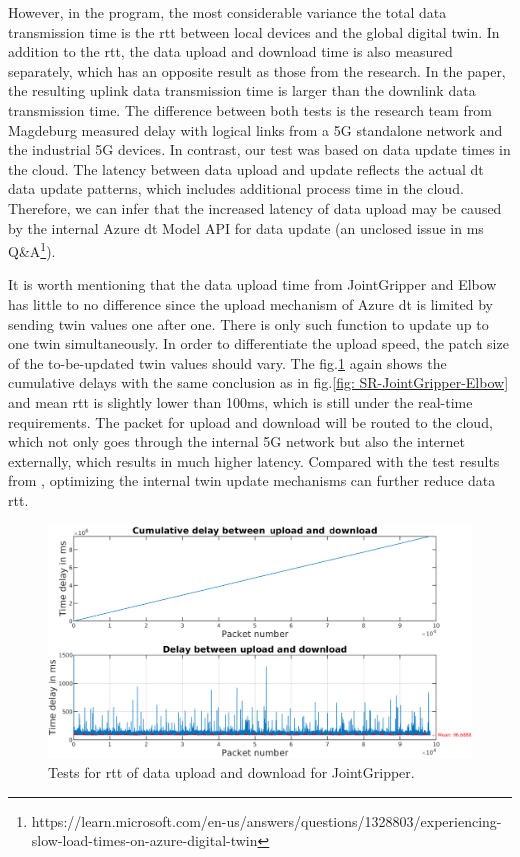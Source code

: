 However, in the program, the most considerable variance 
the total data transmission time is the \gls{rtt} between local devices and the global digital 
twin. In addition to the \gls{rtt}, the data upload and download time is also measured 
separately, which has an opposite result as those from the research\cite{cainelli_performance_2023}. 
In the paper, the resulting uplink data transmission time is larger than the downlink 
data transmission time. The difference between both tests is the research team from 
Magdeburg measured delay with logical links from a 5G standalone network and the industrial 
5G devices. In contrast, our test was based on data update times in the cloud. The latency 
between data upload and update reflects the actual \gls{dt} data update patterns, 
which includes additional process time in the cloud. Therefore, we can infer that the 
increased latency of data upload may be caused by the internal Azure \gls{dt} Model 
API for data update (an unclosed issue in \gls{ms} Q\&A\footnote{https://learn.microsoft.com/en-us/answers/questions/1328803/experiencing-slow-load-times-on-azure-digital-twin}).
    

It is worth mentioning that the data upload time from JointGripper and Elbow has little to 
no difference since the upload mechanism of Azure \gls{dt} is limited by sending twin 
values one after one. There is only such function to update up to one twin simultaneously. 
In order to differentiate the upload speed, the patch size of the to-be-updated twin values 
should vary. The fig.\ref{fig: UD-cycle-JointGripper} again shows the cumulative delays 
with the same conclusion as in fig.\ref{fig: SR-JointGripper-Elbow} and mean \gls{rtt} is 
slightly lower than 100ms, which is still under the real-time requirements. The packet for 
upload and download will be routed to the cloud, which not only goes through the internal 
5G network but also the internet externally, which results in much higher latency. Compared 
with the test results from \cite{cainelli_performance_2023}, optimizing the internal twin 
update mechanisms can further reduce data \gls{rtt}. 


\begin{figure}[htb]
    \includegraphics[width=\textwidth]{figures/tests/DT/Delay_UploadDownloadCycleTime_JointGripper.pdf}
    \centering
    \caption{Tests for \gls{rtt} of data upload and download for JointGripper. \label{fig: UD-cycle-JointGripper}}
\end{figure}


